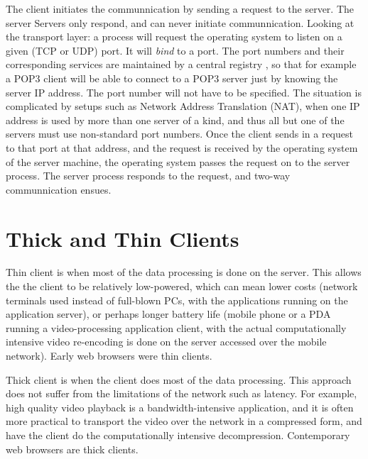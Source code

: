 \documentclass[10pt]{report}
\begin{document}
The client initiates the communnication by sending a request to the server.
The server Servers only respond, and can never initiate communnication.
Looking at the transport layer: a process will request the operating system to
listen on a given (TCP or UDP) port.  It will {\em bind} to a port.  The port
numbers and their corresponding services are maintained by a central registry
\cite{iana}, so that for example a POP3 client will be able to connect to a
POP3 server just by knowing the server IP address.  The port number will not
have to be specified.  The situation is complicated by setups such as Network
Address Translation (NAT), when one IP address is used by more than one server
of a kind, and thus all but one of the servers must use non-standard port
numbers. %
Once the client sends in a request to that port at that address, and the
request is received by the operating system of the server machine, the
operating system passes the request on to the server process.  The server
process responds to the request, and two-way communnication ensues.  


\section{Thick and Thin Clients}

Thin client is when most of the data processing is done on the server.  This allows the the client to be relatively low-powered, which can mean lower costs (network terminals used instead of full-blown PCs, with the applications running on the application server), or perhaps longer battery life (mobile phone or a PDA running a video-processing application client, with the actual computationally intensive video re-encoding is done on the server accessed over the mobile network).  Early web browsers were thin clients.

Thick client is when the client does most of the data processing.  This approach does not suffer from the limitations of the network such as latency.  For example, high quality video playback is a bandwidth-intensive application, and it is often more practical to transport the video over the network in a compressed form, and have the client do the computationally intensive decompression.  Contemporary web browsers are thick clients.

\end{document}
